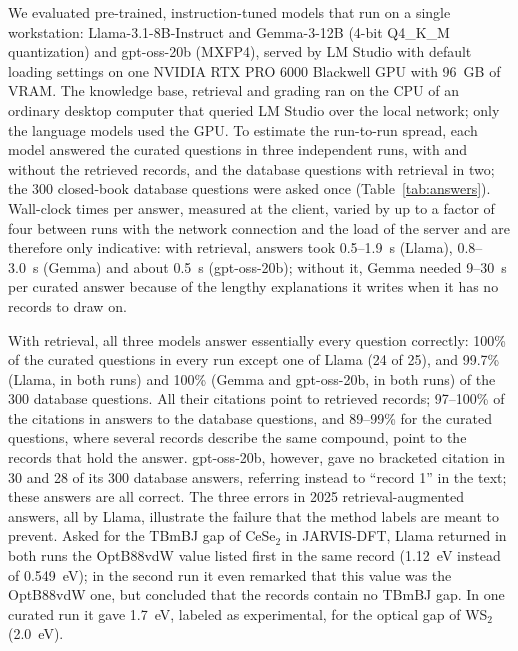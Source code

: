 \documentclass[prmaterials,twocolumn,superscriptaddress,longbibliography,nofootinbib]{revtex4-2}
\begin{document}
We evaluated pre-trained, instruction-tuned models that run on a single workstation:
Llama-3.1-8B-Instruct and Gemma-3-12B (4-bit Q4\_K\_M quantization) and gpt-oss-20b (MXFP4),
served by LM Studio with default loading settings on one NVIDIA RTX PRO 6000 Blackwell GPU
with 96~GB of VRAM. The knowledge base, retrieval and grading ran on the CPU of an ordinary
desktop computer that queried LM Studio over the local network; only the language models used
the GPU. To estimate the run-to-run spread, each model answered the curated questions in
three independent runs, with and without the retrieved records, and the database questions
with retrieval in two; the 300 closed-book database questions were asked once
(Table~\ref{tab:answers}). Wall-clock times per answer, measured at the client, varied by up
to a factor of four between runs with the network connection and the load of the server and
are therefore only indicative: with retrieval, answers took 0.5--1.9~s (Llama), 0.8--3.0~s
(Gemma) and about 0.5~s (gpt-oss-20b); without it, Gemma needed 9--30~s per curated answer because
of the lengthy explanations it writes when it has no records to draw on.

With retrieval, all three models answer essentially every question correctly: 100\% of the
curated questions in every run except one of Llama (24 of 25), and 99.7\% (Llama, in both
runs) and 100\% (Gemma and gpt-oss-20b, in both runs) of the 300 database questions. All their
citations point to retrieved records; 97--100\% of the citations in answers to the database
questions, and 89--99\% for the curated questions, where several records describe the same
compound, point to the records that hold the answer. gpt-oss-20b, however, gave no bracketed
citation in 30 and 28 of its 300 database answers, referring instead to ``record 1'' in the
text; these answers are all correct. The three errors in 2025 retrieval-augmented answers, all
by Llama, illustrate the failure that the method labels are meant to prevent. Asked for the
TBmBJ gap of CeSe$_2$ in JARVIS-DFT, Llama returned in both runs the OptB88vdW value listed
first in the same record (1.12~eV instead of 0.549~eV); in the second run it even remarked
that this value was the OptB88vdW one, but concluded that the records contain no TBmBJ gap.
In one curated run it gave 1.7~eV, labeled as experimental, for the optical gap of WS$_2$
(2.0~eV).
\end{document}
